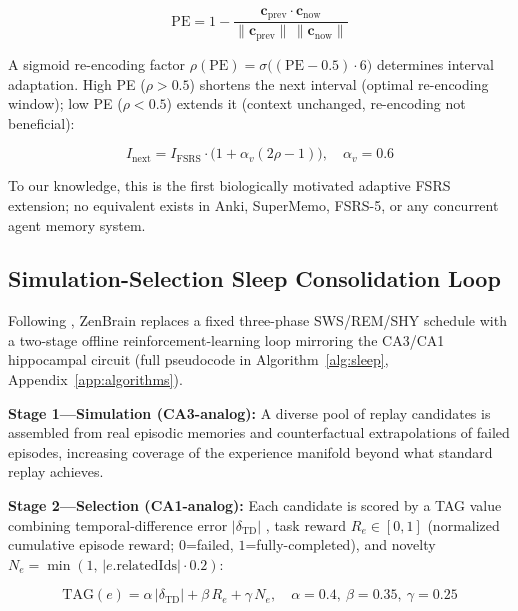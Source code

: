 \documentclass{article}
\begin{document}
\begin{equation}
    \mathrm{PE} = 1 - \frac{\mathbf{c}_{\text{prev}} \cdot \mathbf{c}_{\text{now}}}
    {\|\mathbf{c}_{\text{prev}}\|\,\|\mathbf{c}_{\text{now}}\|}
\end{equation}

A sigmoid re-encoding factor $\rho(\mathrm{PE}) = \sigma\bigl((\mathrm{PE} - 0.5)\cdot 6\bigr)$
determines interval adaptation.
High PE ($\rho > 0.5$) shortens the next interval (optimal re-encoding window);
low PE ($\rho < 0.5$) extends it (context unchanged, re-encoding not beneficial):

\begin{equation}
    I_{\text{next}} = I_{\text{FSRS}} \cdot \bigl(1 + \alpha_v(2\rho - 1)\bigr), \quad \alpha_v = 0.6
\end{equation}

To our knowledge, this is the first biologically motivated adaptive FSRS extension;
no equivalent exists in Anki, SuperMemo, FSRS-5, or any concurrent agent memory system.

\subsection{Simulation-Selection Sleep Consolidation Loop}
\label{sec:simsel}

Following \citet{chen2025,marche2025}, ZenBrain replaces a fixed three-phase
SWS/REM/SHY schedule with a two-stage offline reinforcement-learning loop
mirroring the CA3/CA1 hippocampal circuit \citep{ji2007,oneill2010}
(full pseudocode in Algorithm~\ref{alg:sleep}, Appendix~\ref{app:algorithms}).

\textbf{Stage 1---Simulation (CA3-analog):}
A diverse pool of replay candidates is assembled from real episodic memories
and counterfactual extrapolations of failed episodes,
increasing coverage of the experience manifold beyond what standard replay achieves.

\textbf{Stage 2---Selection (CA1-analog):}
Each candidate is scored by a TAG value combining temporal-difference error
$|\delta_{\mathrm{TD}}|$ \citep{schultz1997}, task reward $R_e\in[0,1]$
(normalized cumulative episode reward; $0$=failed, $1$=fully-completed),
and novelty $N_e=\min(1,\, |e.\mathrm{relatedIds}|\cdot 0.2)$:

\begin{equation}
    \mathrm{TAG}(e) = \alpha\,|\delta_{\mathrm{TD}}| + \beta\,R_e + \gamma\,N_e,
    \quad \alpha=0.4,\ \beta=0.35,\ \gamma=0.25
\end{equation}
\end{document}
